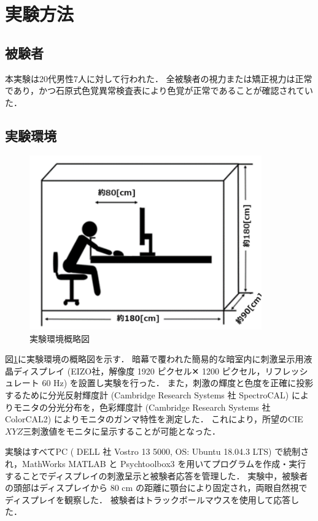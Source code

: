     \section{実験方法}
        \subsection{被験者}
            本実験は20代男性7人に対して行われた．
            全被験者の視力または矯正視力は正常であり，かつ石原式色覚異常検査表により色覚が正常であることが確認されていた．

        \subsection{実験環境}

            \begin{figure}[h]
                \centering
                \includegraphics[width=10.0cm]{./img/darkroom_p.png}
                \caption{実験環境概略図}
                \label{darkroom}
            \end{figure}

            図\ref{darkroom}に実験環境の概略図を示す．
            暗幕で覆われた簡易的な暗室内に刺激呈示用液晶ディスプレイ (EIZO社，解像度 1920 ピクセル✕ 1200 ピクセル，リフレッシュレート 60 Hz) を設置し実験を行った．
            また，刺激の輝度と色度を正確に投影するために分光反射輝度計 (Cambridge Research Systems 社 SpectroCAL) によりモニタの分光分布を，色彩輝度計 (Cambridge Research Systems 社 ColorCAL2) によりモニタのガンマ特性を測定した．
            これにより，所望のCIE $XYZ$三刺激値をモニタに呈示することが可能となった．
            
            実験はすべてPC ( DELL 社 Vostro 13 5000, OS: Ubuntu 18.04.3 LTS) で統制され，MathWorks MATLAB と Psychtoolbox3\cite{Psychtoolbox} を用いてプログラムを作成・実行することでディスプレイの刺激呈示と被験者応答を管理した．
            実験中，被験者の頭部はディスプレイから 80 cm の距離に顎台により固定され，両眼自然視でディスプレイを観察した．
            被験者はトラックボールマウスを使用して応答した．

